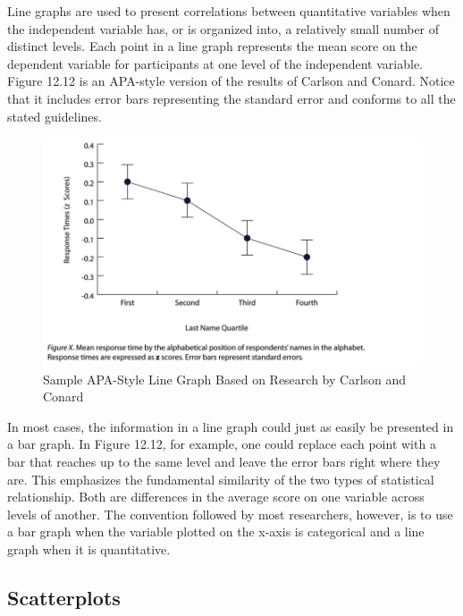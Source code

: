 Line graphs are used to present correlations between quantitative variables when the independent variable has, or is organized into, a relatively small number of distinct levels. Each point in a line graph represents the mean score on the dependent variable for participants at one level of the independent variable. Figure 12.12 is an APA-style version of the results of Carlson and Conard. Notice that it includes error bars representing the standard error and conforms to all the stated guidelines.

\begin{figure}
\includegraphics[width=\linewidth]{figures/Fig12-12}
\caption{Sample APA-Style Line Graph Based on Research by Carlson and Conard}
\label{fig:lineAPA}
\end{figure}

In most cases, the information in a line graph could just as easily be presented in a bar graph. In Figure 12.12, for example, one could replace each point with a bar that reaches up to the same level and leave the error bars right where they are. This emphasizes the fundamental similarity of the two types of statistical relationship. Both are differences in the average score on one variable across levels of another. The convention followed by most researchers, however, is to use a bar graph when the variable plotted on the x-axis is categorical and a line graph when it is quantitative.

\subsection{Scatterplots}

